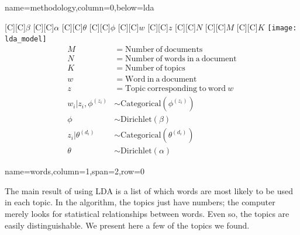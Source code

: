 \documentclass[landscape,final]{baposter}
\begin{document}
\begin{poster}
{  }
  {name=methodology,column=0,below=lda}{

	\begin{centering}
	  [C]{\Large$\beta$}
	  [C]{\Large$\alpha$}
	  [C]{\Large$\theta$}
	  [C]{\Large$\phi$}
	  [C]{\Large$w$}
	  [C]{\Large$z$}
	  [C]{\large$N$}
	  [C]{\large$M$}
	  [C]{\large$K$}
	  \texttt{[image: lda\_model]}
	  \begin{align*} 
		M &= \mathrm{Number\ of\ documents} \\
		N &= \mathrm{Number\ of\ words\ in\ a\ document} \\
		K &= \mathrm{Number\ of\ topics} \\
		w &= \mathrm{Word\ in\ a\ document} \\
		z &= \mathrm{Topic\ corresponding\ to\ word\ } w \\
		w_i|z_i,\phi^{(z_i)} &\sim \mathrm{Categorical}(\phi^{(z_i)}) \\
		\phi &\sim \mathrm{Dirichlet}(\beta) \\
		z_i|\theta^{(d_i)} &\sim \mathrm{Categorical}(\theta^{(d_i)}) \\ 
		\theta &\sim \mathrm{Dirichlet}(\alpha) 
	  \end{align*}
	\end{centering}

  }

  {name=words,column=1,span=2,row=0}{

	The main result of using LDA is a list of which words are most likely to be
	used in each topic.  In the algorithm, the topics just have numbers; the
	computer merely looks for statistical relationships between words.  Even
	so, the topics are easily distinguishable.  We present here a few of the
	topics we found.

}
\end{poster}
\end{document}
